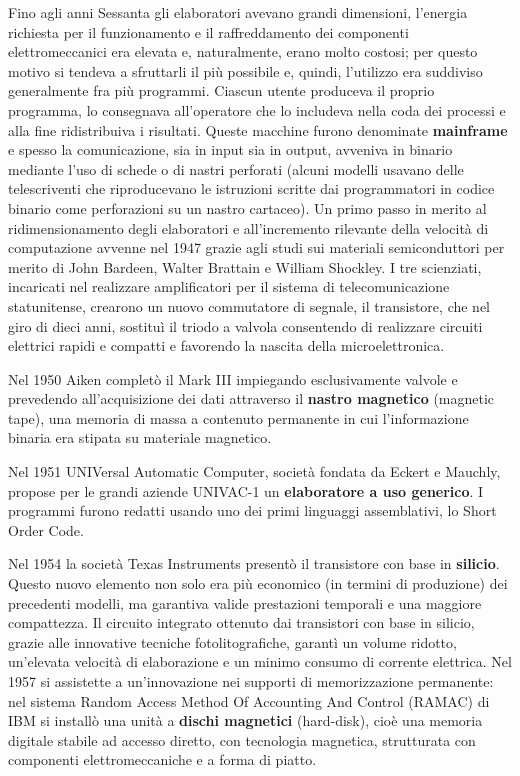 \documentclass[12pt]{article} %
\begin{document}
Fino agli anni Sessanta gli elaboratori avevano grandi dimensioni, l’energia richiesta per il funzionamento e il raffreddamento dei componenti elettromeccanici era elevata e, naturalmente, erano molto costosi; per questo motivo si tendeva a sfruttarli il più possibile e, quindi, l’utilizzo era suddiviso generalmente fra più programmi. Ciascun utente produceva il proprio programma, lo consegnava all’operatore che lo includeva nella coda dei processi e alla fine ridistribuiva i risultati. Queste macchine furono denominate \textbf{mainframe} e spesso la comunicazione, sia in input sia in output, avveniva in binario mediante l’uso di schede o di nastri perforati (alcuni modelli usavano delle telescriventi che riproducevano le istruzioni scritte dai programmatori in codice binario come perforazioni su un nastro cartaceo). Un primo passo in merito al ridimensionamento degli elaboratori e all’incremento rilevante della velocità di computazione avvenne nel 1947 grazie agli studi sui materiali semiconduttori per merito di John Bardeen, Walter Brattain e William Shockley. I tre scienziati, incaricati nel realizzare amplificatori per il sistema di telecomunicazione statunitense, crearono un nuovo commutatore di segnale, il transistore, che nel giro di dieci anni, sostituì il triodo a valvola consentendo di realizzare circuiti elettrici rapidi e compatti e favorendo la nascita della microelettronica.\par\medskip\noindent
Nel 1950 Aiken completò il Mark III impiegando esclusivamente valvole e prevedendo all’acquisizione dei dati attraverso il \textbf{nastro magnetico} (magnetic tape), una memoria di massa a contenuto permanente in cui l’informazione binaria era stipata su materiale magnetico.\par\medskip\noindent
Nel 1951 UNIVersal Automatic Computer, società fondata da Eckert e Mauchly, propose per le grandi aziende UNIVAC-1 un \textbf{elaboratore a uso generico}. I programmi furono redatti usando uno dei primi linguaggi assemblativi, lo Short Order Code.\par\medskip\noindent
Nel 1954 la società Texas Instruments presentò il transistore con base in \textbf{silicio}. Questo nuovo elemento non solo era più economico (in termini di produzione) dei precedenti modelli, ma garantiva valide prestazioni temporali e una maggiore compattezza. Il circuito integrato ottenuto dai transistori con base in silicio, grazie alle innovative tecniche fotolitografiche, garantì un volume ridotto, un’elevata velocità di elaborazione e un minimo consumo di corrente elettrica. Nel 1957 si assistette a un’innovazione nei supporti di memorizzazione permanente: nel sistema Random Access Method Of Accounting And Control (RAMAC) di IBM si installò una unità a \textbf{dischi magnetici} (hard-disk), cioè una memoria digitale stabile ad accesso diretto, con tecnologia magnetica, strutturata con componenti elettromeccaniche e a forma di piatto. \par\medskip\noindent
\end{document}
